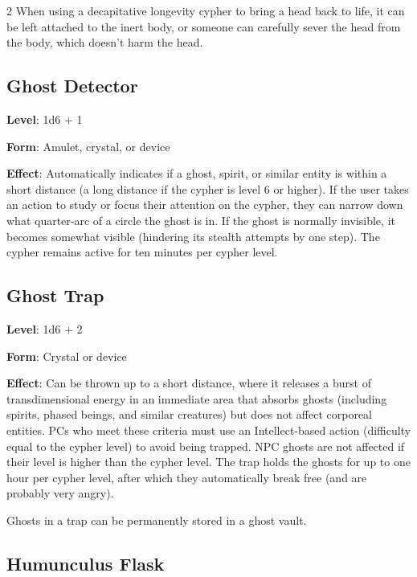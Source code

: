 \begin{multicols}{2}
When using a decapitative longevity cypher to bring a head back to life, it can be left attached to the inert body, or someone can carefully sever the head from the body, which doesn’t harm the head.

\subsection{Ghost Detector}

\textbf{Level}: 1d6 + 1

\textbf{Form}: Amulet, crystal, or device 

\textbf{Effect}: Automatically indicates if a ghost, spirit, or similar entity is within a short distance (a long distance if the cypher is level 6 or higher). If the user takes an action to study or focus their attention on the cypher, they can narrow down what quarter-arc of a circle the ghost is
in. If the ghost is normally invisible, it becomes somewhat visible (hindering its stealth attempts by one step). The cypher remains active for ten minutes per cypher level.

\subsection{Ghost Trap}

\textbf{Level}: 1d6 + 2

\textbf{Form}: Crystal or device

\textbf{Effect}: Can be thrown up to a short distance, where it releases a burst of transdimensional energy in an immediate area that absorbs ghosts (including spirits, phased beings, and similar creatures) but does not affect corporeal entities. PCs who meet these criteria must use an Intellect-based action (difficulty equal to the cypher level) to avoid being trapped. NPC ghosts are not affected if their level is higher than the cypher level. The trap holds the ghosts for up to one hour per cypher level, after which they automatically break free (and are probably very angry).
	
Ghosts in a trap can be permanently stored in a ghost vault. 

\subsection{Humunculus Flask}


\end{multicols}
